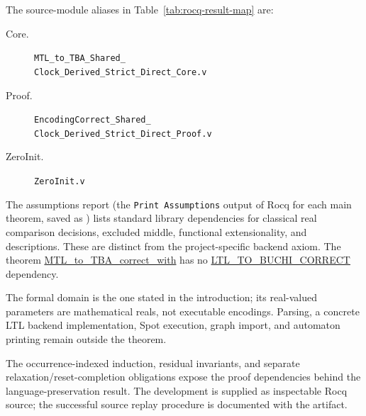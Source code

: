 \documentclass{ieeeaccess}
\newcommand{\Rocqid}[1]{\url{#1}}
\begin{document}
The source-module aliases in Table~\ref{tab:rocq-result-map} are:
\begin{description}
\item[Core.] \texttt{MTL\_to\_TBA\_Shared\_}\\
\texttt{Clock\_Derived\_Strict\_Direct\_Core.v}
\item[Proof.] \texttt{EncodingCorrect\_Shared\_}\\
\texttt{Clock\_Derived\_Strict\_Direct\_Proof.v}
\item[ZeroInit.] \texttt{ZeroInit.v}

\end{description}

The assumptions report (the \texttt{Print Assumptions} output of Rocq for each
main theorem, saved as ) lists standard library
dependencies for classical real comparison
decisions, excluded middle, functional extensionality, and descriptions.
These are distinct from the project-specific backend axiom. The theorem
\Rocqid{MTL_to_TBA_correct_with} has no
\Rocqid{LTL_TO_BUCHI_CORRECT} dependency. 

The formal domain is the one stated in the introduction; its real-valued
parameters are mathematical reals, not executable encodings. Parsing, a concrete
LTL backend implementation, Spot execution, graph import, and automaton
printing remain outside the theorem. 

The occurrence-indexed induction, residual invariants, and separate
relaxation/reset-completion obligations expose the proof dependencies behind
the language-preservation result. The development is supplied as inspectable
Rocq source; the successful source replay procedure is
documented with the artifact.
\end{document}
